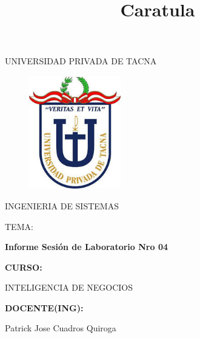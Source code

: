 \documentclass[preprint,12pt]{elsarticle}
\begin{document}
\title{Caratula}

\begin{titlepage}
\begin{center}
\large{UNIVERSIDAD PRIVADA DE TACNA}\\
\vspace*{-0.025in}
\begin{figure}[htb]
\begin{center}
\includegraphics[width=4cm]{./IMAGENES/logo.jpg}
\end{center}
\end{figure}
\vspace*{0.15in}
INGENIERIA DE SISTEMAS  \\

\vspace*{0.5in}
\begin{large}
TEMA:\\
\end{large}

\vspace*{0.1in}
\begin{Large}
\textbf{Informe Sesión de Laboratorio Nro 04} \\
\end{Large}

\vspace*{0.3in}
\begin{Large}
\textbf{CURSO:} \\
\end{Large}

\vspace*{0.1in}
\begin{large}
INTELIGENCIA DE NEGOCIOS\\
\end{large}

\vspace*{0.3in}
\begin{Large}
\textbf{DOCENTE(ING):} \\
\end{Large}

\vspace*{0.1in}
\begin{large}
 Patrick Jose Cuadros Quiroga\\
\end{large}


\end{center}
\end{titlepage}
\end{document}
